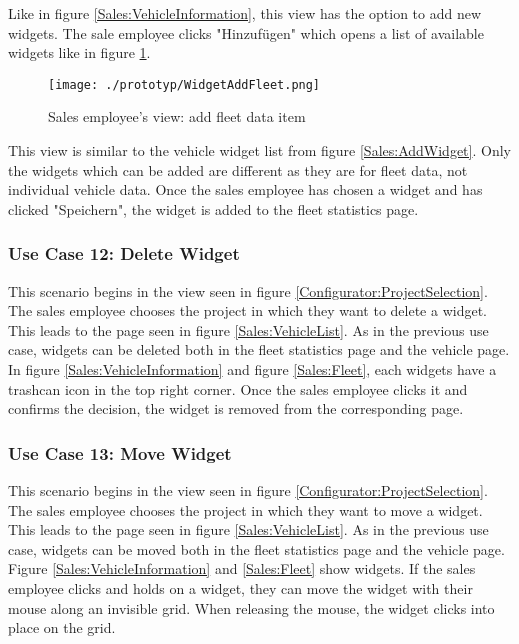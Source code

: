 Like in figure \ref{Sales:VehicleInformation}, this view has the option to add new widgets. The sale employee clicks "Hinzufügen" which opens a list of available widgets like in figure \ref{Sales:FleetWidget}.

\begin{figure}[ht]
  \centering
  \texttt{[image: ./prototyp/WidgetAddFleet.png]}
  \caption{Sales employee's view: add fleet data item}
  \label{Sales:FleetWidget}
\end{figure}

This view is similar to the vehicle widget list from figure \ref{Sales:AddWidget}. Only the widgets which can be added are different as they are for fleet data, not individual vehicle data. Once the sales employee has chosen a widget and has clicked "Speichern", the widget is added to the fleet statistics page.


\subsubsection{Use Case 12: Delete Widget}
This scenario begins in the view seen in figure \ref{Configurator:ProjectSelection}. The sales employee chooses the project in which they want to delete a widget. This leads to the page seen in figure \ref{Sales:VehicleList}. As in the previous use case, widgets can be deleted both in the fleet statistics page and the vehicle page. In figure \ref{Sales:VehicleInformation} and figure \ref{Sales:Fleet}, each widgets have a trashcan icon in the top right corner. Once the sales employee clicks it and confirms the decision, the widget is removed from the corresponding page.


\subsubsection{Use Case 13: Move Widget}
This scenario begins in the view seen in figure \ref{Configurator:ProjectSelection}. The sales employee chooses the project in which they want to move a widget. This leads to the page seen in figure \ref{Sales:VehicleList}. As in the previous use case, widgets can be moved both in the fleet statistics page and the vehicle page. Figure \ref{Sales:VehicleInformation} and \ref{Sales:Fleet} show widgets. If the sales employee clicks and holds on a widget, they can move the widget with their mouse along an invisible grid. When releasing the mouse, the widget clicks into place on the grid.